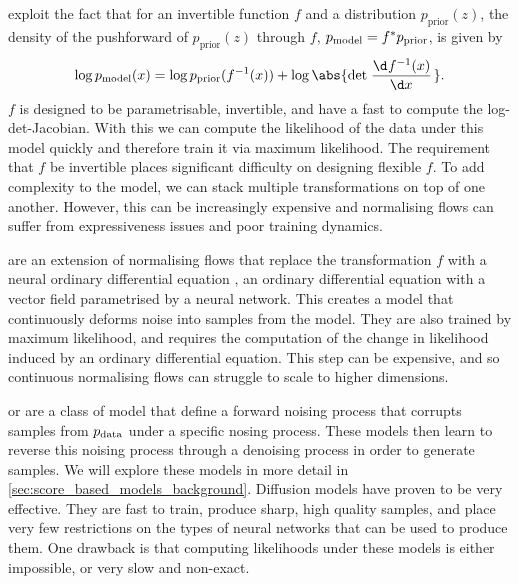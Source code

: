 \cite{rezende15variational,tabak2010density, tabak2013family} exploit the fact that for an invertible function \(f\) and a distribution \(p_{\text{prior}} (z)\), the density of the pushforward of \(p_{\text{prior}} (z)\) through \(f\), \(p_{\text{model}} = f^* p_{\text{prior}}\), is given by 
\[ \log \pmodel(x) = \log p_{\text{prior}} (f^{-1}(x)) + \log \abs{\det\od{f^{-1}(x)}{x}}.\]
\(f\) is designed to be parametrisable, invertible, and have a fast to compute the log-det-Jacobian.
With this we can compute the likelihood of the data under this model quickly and therefore train it via maximum likelihood.
The requirement that \(f\) be invertible places significant difficulty on designing flexible \(f\).
To add complexity to the model, we can stack multiple transformations on top of one another.
However, this can be increasingly expensive and normalising flows can suffer from expressiveness issues and poor training dynamics.

 \cite{chen2018neural,grathwohl2019scalable} are an extension of normalising flows that replace the transformation \(f\) with a neural ordinary differential equation \cite{chen2018neural}, an ordinary differential equation with a vector field parametrised by a neural network.
This creates a model that continuously deforms noise into samples from the model.
They are also trained by maximum likelihood, and requires the computation of the change in likelihood induced by an ordinary differential equation.
This step can be expensive, and so continuous normalising flows can struggle to scale to higher dimensions.

 or  \cite{song2019generative,sohl2015deep, ho2020denoising} are a class of model that define a forward noising process that corrupts samples from \(p_{\text{data}}\) under a specific nosing process.
These models then learn to reverse this noising process through a denoising process in order to generate samples.
We will explore these models in more detail in \cref{sec:score_based_models_background}.
Diffusion models have proven to be very effective.
They are fast to train, produce sharp, high quality samples, and place very few restrictions on the types of neural networks that can be used to produce them.
One drawback is that computing likelihoods under these models is either impossible, or very slow and non-exact.


